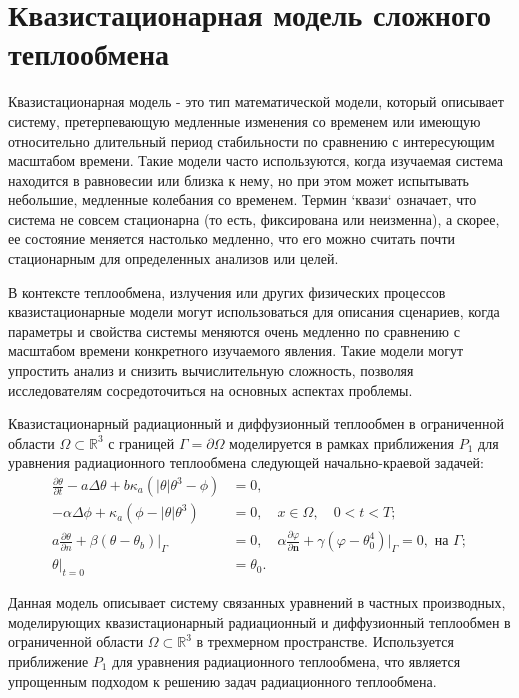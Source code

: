\section{Квазистационарная модель сложного теплообмена}
\label{sec:ch1/sec4}
Квазистационарная модель - это тип математической модели,
который описывает систему, претерпевающую медленные изменения
со временем или имеющую относительно длительный период стабильности
по сравнению с интересующим масштабом времени.
Такие модели часто используются, когда изучаемая система находится
в равновесии или близка к нему, но при этом может испытывать небольшие,
медленные колебания со временем.
Термин `квази` означает,
что система не совсем стационарна (то есть, фиксирована или неизменна),
а скорее, ее состояние меняется настолько медленно, что его можно считать
почти стационарным для определенных анализов или целей.

В контексте теплообмена, излучения или других физических процессов
квазистационарные модели могут использоваться для описания сценариев,
когда параметры и свойства системы меняются очень медленно по сравнению
с масштабом времени конкретного изучаемого явления.
Такие модели могут упростить анализ и снизить вычислительную сложность,
позволяя исследователям сосредоточиться на основных аспектах проблемы.


Квазистационарный радиационный и диффузионный теплообмен в ограниченной
области $\Omega \subset \mathbb{R}^3$ с границей
$\Gamma = \partial\Omega$ моделируется в рамках приближения $P_1$
для уравнения радиационного теплообмена следующей
начально-краевой задачей:
\begin{align}
    \frac{\partial\theta}{\partial t} - a\Delta\theta
    + b\kappa_a (|\theta|\theta^3 - \phi) &= 0, \\
    - \alpha\Delta\phi + \kappa_a (\phi - |\theta|\theta^3 ) &= 0,
    \quad x \in \Omega, \quad 0 < t < T ; \label{eq:1_5:1} \\
    a \frac{\partial \theta}{\partial n}
    +\left.\beta\left(\theta-\theta_{b}\right)\right|_{\Gamma}&=0,
    \quad \alpha \frac{\partial \varphi}{\partial \mathbf{n}} + \gamma
    (\varphi-\theta_0^4)|_{\Gamma} = 0, \text{ на } \Gamma; \label{eq:1_5:2} \\
    \theta|_{t=0} &= \theta_0. \label{eq:1_5:3}
\end{align}

Данная модель описывает систему связанных уравнений в частных производных,
моделирующих квазистационарный радиационный и диффузионный теплообмен в
ограниченной области $\Omega \subset \mathbb{R}^3$ в трехмерном пространстве.
Используется приближение $P_1$ для уравнения радиационного теплообмена,
что является упрощенным подходом к решению задач радиационного теплообмена.

